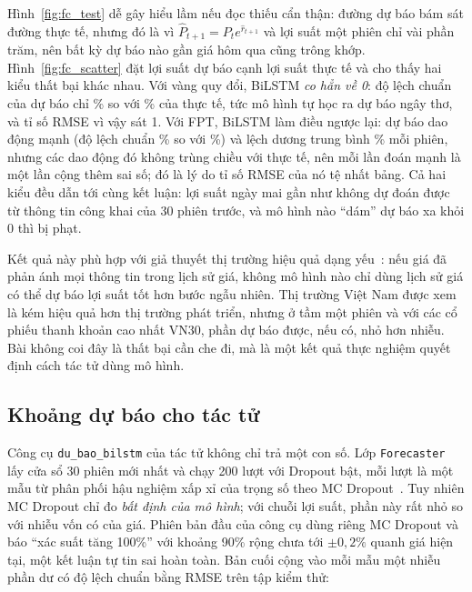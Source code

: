 Hình~\ref{fig:fc_test} dễ gây hiểu lầm nếu đọc thiếu cẩn thận: đường dự báo bám sát đường thực tế, nhưng đó là vì
$\hat P_{t+1} = P_t e^{\hat r_{t+1}}$ và lợi suất một phiên chỉ vài phần trăm, nên bất kỳ dự báo nào gần giá hôm qua
cũng trông khớp. Hình~\ref{fig:fc_scatter} đặt lợi suất dự báo cạnh lợi suất thực tế và cho thấy hai kiểu thất bại
khác nhau. Với vàng quy đổi, BiLSTM \emph{co hẳn về 0}: độ lệch chuẩn của dự báo chỉ \% so với
\% của thực tế, tức mô hình tự học ra dự báo ngây thơ, và tỉ số RMSE vì vậy sát 1. Với
FPT, BiLSTM làm điều ngược lại: dự báo dao động mạnh (độ lệch chuẩn \% so với
\%) và lệch dương trung bình \% mỗi phiên, nhưng các
dao động đó không trùng chiều với thực tế, nên mỗi lần đoán mạnh là một lần cộng thêm sai số; đó là lý do tỉ số RMSE
của nó tệ nhất bảng. Cả hai kiểu đều dẫn tới cùng kết luận: lợi suất ngày mai gần như không dự đoán được từ thông tin
công khai của 30 phiên trước, và mô hình nào ``dám'' dự báo xa khỏi 0 thì bị phạt.


Kết quả này phù hợp với giả thuyết thị trường hiệu quả dạng yếu~\cite{fama1970efficient}: nếu giá đã phản ánh mọi
thông tin trong lịch sử giá, không mô hình nào chỉ dùng lịch sử giá có thể dự báo lợi suất tốt hơn bước ngẫu nhiên.
Thị trường Việt Nam được xem là kém hiệu quả hơn thị trường phát triển, nhưng ở tầm một phiên và với các cổ phiếu
thanh khoản cao nhất VN30, phần dự báo được, nếu có, nhỏ hơn nhiễu. Bài không coi đây là thất bại cần che đi, mà là
một kết quả thực nghiệm quyết định cách tác tử dùng mô hình.

\subsection{Khoảng dự báo cho tác tử}
Công cụ \texttt{du\_bao\_bilstm} của tác tử không chỉ trả một con số. Lớp \texttt{Forecaster} lấy cửa sổ 30 phiên
mới nhất và chạy 200 lượt với Dropout bật, mỗi lượt là một mẫu từ phân phối hậu nghiệm xấp xỉ của trọng số theo MC
Dropout~\cite{gal2016dropout}. Tuy nhiên MC Dropout chỉ đo \emph{bất định của mô hình}; với chuỗi lợi suất, phần này
rất nhỏ so với nhiễu vốn có của giá. Phiên bản đầu của công cụ dùng riêng MC Dropout và báo ``xác suất tăng 100\%''
với khoảng 90\% rộng chưa tới $\pm 0{,}2\%$ quanh giá hiện tại, một kết luận tự tin sai hoàn toàn. Bản cuối cộng vào
mỗi mẫu một nhiễu phần dư có độ lệch chuẩn bằng RMSE trên tập kiểm thử:

